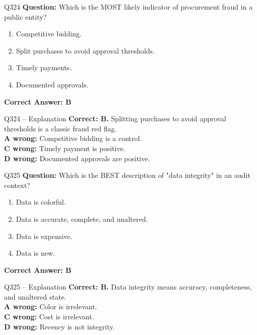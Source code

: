 \documentclass[aspectratio=169,10pt]{beamer}
\begin{document}
	\begin{frame}[t]{Q324}
		\small
		\textbf{Question:} Which is the MOST likely indicator of procurement fraud in a public entity?
		\begin{enumerate}[label=\Alph*.,itemsep=1pt,topsep=2pt]
			\item Competitive bidding.
			\item Split purchases to avoid approval thresholds.
			\item Timely payments.
			\item Documented approvals.
		\end{enumerate}
		\vspace{4pt}
		\textbf{Correct Answer: B}
	\end{frame}
	
	\begin{frame}[t]{Q324 -- Explanation}
		\small
		\textbf{Correct: B.} Splitting purchases to avoid approval thresholds is a classic fraud red flag. \\[4pt]
		\textbf{A wrong:} Competitive bidding is a control. \\[2pt]
		\textbf{C wrong:} Timely payment is positive. \\[2pt]
		\textbf{D wrong:} Documented approvals are positive.
	\end{frame}
	
	\begin{frame}[t]{Q325}
		\small
		\textbf{Question:} Which is the BEST description of "data integrity" in an audit context?
		\begin{enumerate}[label=\Alph*.,itemsep=1pt,topsep=2pt]
			\item Data is colorful.
			\item Data is accurate, complete, and unaltered.
			\item Data is expensive.
			\item Data is new.
		\end{enumerate}
		\vspace{4pt}
		\textbf{Correct Answer: B}
	\end{frame}
	
	\begin{frame}[t]{Q325 -- Explanation}
		\small
		\textbf{Correct: B.} Data integrity means accuracy, completeness, and unaltered state. \\[4pt]
		\textbf{A wrong:} Color is irrelevant. \\[2pt]
		\textbf{C wrong:} Cost is irrelevant. \\[2pt]
		\textbf{D wrong:} Recency is not integrity.
	\end{frame}
	
\end{document}

